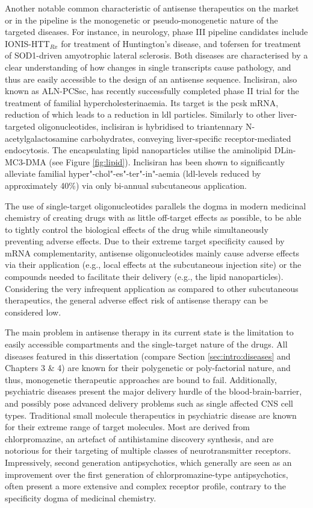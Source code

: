 Another notable common characteristic of antisense therapeutics on the market or in the pipeline is the monogenetic or pseudo-monogenetic nature of the targeted diseases. For instance, in neurology, phase III pipeline candidates include IONIS-HTT$_{Rx}$ for treatment of Huntington's disease, and tofersen for treatment of SOD1-driven amyotrophic lateral sclerosis. Both diseases are characterised by a clear understanding of how changes in single transcripts cause pathology, and thus are easily accessible to the design of an antisense sequence. Inclisiran, also known as ALN-PCSsc, has recently successfully completed phase II trial for the treatment of familial hypercholesterinaemia.\cite{Raal2020} Its target is the \ac{pcsk} mRNA, reduction of which leads to a reduction in \ac{ldl} particles. Similarly to other liver-targeted oligonucleotides, inclisiran is hybridised to triantennary N-acetylgalactosamine carbohydrates, conveying liver-specific receptor-mediated endocytosis. The encapsulating lipid nanoparticles utilise the aminolipid DLin-MC3-DMA (see Figure \ref{fig:lipid}).\cite{Jayaraman2012} Inclisiran has been shown to significantly alleviate familial hyper"-chol"-es"-ter"-in"-aemia (\ac{ldl}-levels reduced by approximately 40\%) via only bi-annual subcutaneous application.\cite{Frank-Kamenetsky2008, Fitzgerald2014, Fitzgerald2017, Raal2020}

The use of single-target oligonucleotides parallels the dogma in modern medicinal chemistry of creating drugs with as little off-target effects as possible, to be able to tightly control the biological effects of the drug while simultaneously preventing adverse effects. Due to their extreme target specificity caused by mRNA complementarity, antisense oligonucleotides mainly cause adverse effects via their application (e.g., local effects at the subcutaneous injection site) or the compounds needed to facilitate their delivery (e.g., the lipid nanoparticles). Considering the very infrequent application as compared to other subcutaneous therapeutics, the general adverse effect risk of antisense therapy can be considered low.\cite{Raal2020}

The main problem in antisense therapy in its current state is the limitation to easily accessible compartments and the single-target nature of the drugs. All diseases featured in this dissertation (compare Section \ref{sec:intro:diseases} and Chapters 3 \& 4) are known for their polygenetic or poly-factorial nature, and thus, monogenetic therapeutic approaches are bound to fail. Additionally, psychiatric diseases present the major delivery hurdle of the blood-brain-barrier, and possibly pose advanced delivery problems such as single affected CNS cell types. Traditional small molecule therapeutics in psychiatric disease are known for their extreme range of target molecules. Most are derived from chlorpromazine, an artefact of antihistamine discovery synthesis, and are notorious for their targeting of multiple classes of neurotransmitter receptors. Impressively, second generation antipsychotics, which generally are seen as an improvement over the first generation of chlorpromazine-type antipsychotics, often present a more extensive and complex receptor profile, contrary to the specificity dogma of medicinal chemistry.

